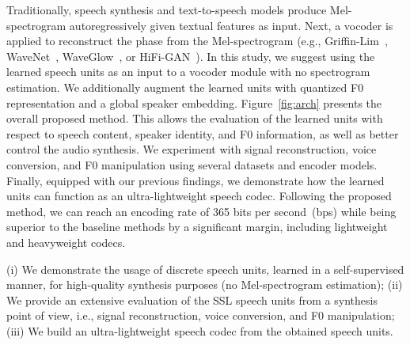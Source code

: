 Traditionally, speech synthesis and text-to-speech models produce Mel-spectrogram autoregressively given textual features as input.
Next, a vocoder is applied to reconstruct the phase from the Mel-spectrogram (e.g., Griffin-Lim~\cite{griffin1984signal}, WaveNet~\cite{oord2016wavenet}, WaveGlow~\cite{waveglow}, or HiFi-GAN~\cite{kong2020hifi}). In this study, we suggest using the learned speech units as an input to a vocoder module with no spectrogram estimation. We additionally augment the learned units with quantized F0 representation and a global speaker embedding. Figure~\ref{fig:arch} presents the overall proposed method.
This allows the evaluation of the learned units with respect to speech content, speaker identity, and F0 information, as well as better control the audio synthesis. 
We experiment with signal reconstruction, voice conversion, and F0 manipulation using several datasets and encoder models. Finally, equipped with our previous findings, we demonstrate how the learned units can function as an ultra-lightweight speech codec. Following the proposed method, we can reach an encoding rate of 365 bits per second~(bps) while being superior to the baseline methods by a significant margin, including lightweight and heavyweight codecs. 

(i) We demonstrate the usage of discrete speech units, learned in a self-supervised manner, for high-quality synthesis purposes (no Mel-spectrogram estimation); (ii) We provide an extensive evaluation of the SSL speech units from a synthesis point of view, i.e., signal reconstruction, voice conversion, and F0 manipulation; (iii) We build an ultra-lightweight speech codec from the obtained speech units.
